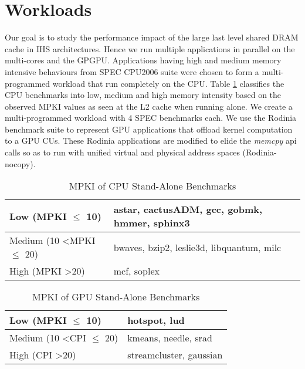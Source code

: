 \section{Workloads} 
Our goal is to study the performance impact of the large last level shared DRAM cache in IHS architectures. Hence we run multiple applications in parallel on the multi-cores and the GPGPU. Applications having high and medium memory intensive behaviours from SPEC CPU2006 suite \cite{spec2006} were chosen to form a multi-programmed workload that run completely on the CPU. Table \ref{single-cpu-mpki} classifies the CPU benchmarks into low, medium and high memory intensity based on the observed MPKI values as seen at the L2 cache when running alone. We create a multi-programmed workload with 4 SPEC benchmarks each. We use the Rodinia benchmark suite \cite{rodinia} to represent GPU applications that offload kernel computation to a GPU CUs. These Rodinia applications are modified to elide the \textit{memcpy} api calls so as to run with unified virtual and physical address spaces (Rodinia-nocopy). 

\begin{table}[htb]
	\centering
	\begin{tabular}{|l|l|}
		\hline
		Low (MPKI $\leq$ 10)          \hspace{5em}      & astar, cactusADM, gcc, gobmk, hmmer, sphinx3    \\ \hline
		Medium (10 \textless MPKI $\leq$ 20) & bwaves, bzip2, leslie3d, libquantum, milc \\ \hline
		High (MPKI \textgreater 20)            & mcf, soplex       \\ \hline
	\end{tabular}
	\caption{MPKI of CPU Stand-Alone Benchmarks}
	\label{single-cpu-mpki}
\end{table}

\begin{table}[htb]
	\centering
	\begin{tabular}{|l|l|}
		\hline
		Low (MPKI $\leq$ 10)                & hotspot, lud           \\ \hline
		Medium (10 \textless CPI $\leq$ 20) &  kmeans, needle, srad   \\ \hline
		High (CPI \textgreater 20)            & streamcluster, gaussian       \\ \hline
	\end{tabular}
	\caption{MPKI of GPU Stand-Alone Benchmarks}
	\label{single-gpu-mpki}
\end{table}

